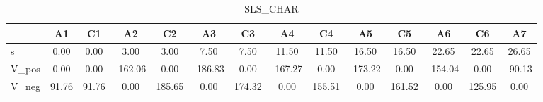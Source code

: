 \begin{table}[H]
\caption{SLS_CHAR}
\begin{tabular}{lSSSSSSSSSSSSS}
\toprule
{} & {A1} & {C1} & {A2} & {C2} & {A3} & {C3} & {A4} & {C4} & {A5} & {C5} & {A6} & {C6} & {A7} \\
\midrule
s & 0.00 & 0.00 & 3.00 & 3.00 & 7.50 & 7.50 & 11.50 & 11.50 & 16.50 & 16.50 & 22.65 & 22.65 & 26.65 \\
V_pos & 0.00 & 0.00 & -162.06 & 0.00 & -186.83 & 0.00 & -167.27 & 0.00 & -173.22 & 0.00 & -154.04 & 0.00 & -90.13 \\
V_neg & 91.76 & 91.76 & 0.00 & 185.65 & 0.00 & 174.32 & 0.00 & 155.51 & 0.00 & 161.52 & 0.00 & 125.95 & 0.00 \\
\bottomrule
\end{tabular}
\end{table}

